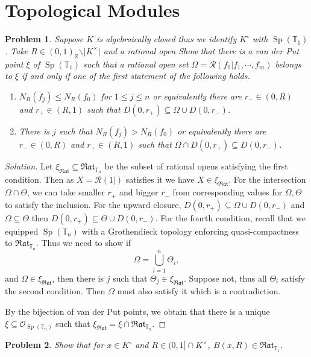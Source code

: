 \documentclass[8pt]{article}
\numberwithin{equation}{section}
\newenvironment{solution}{\begin{proof}[Solution]}{\end{proof}}
\newtheorem{problem}{Problem}[section]
\DeclareMathOperator{\Sp}{Sp}
\newcommand{\Ouv}{\mathscr{O}}
\newcommand{\R}[0]{\mathbb{R}}
\newcommand{\T}[0]{\mathbb{T}}
\newcommand{\cR}[0]{\mathcal{R}}
\newcommand{\ab}[1]{\vert #1 \vert}
\newcommand{\Rat}[0]{\mathfrak{Rat}}
\begin{document}
\section{Topological Modules}
\begin{problem}
  Suppose $K$ is algebraically closed thus we identify $K^\circ$ with $\Sp(\T_1)$. Take $R\in(0,1)_\R\backslash\ab{K^\times}$ and a rational open 
  Show that there is a van der Put point $\xi$ of $\Sp({\T_1})$ such that a rational open set $\Omega = \cR(f_0|f_1,\cdots,f_m)$ belongs to $\xi$ if and only if one of the first statement of the following holds.
  \begin{enumerate}
    \item $N_R(f_j)\leq N_R(f_0)$ for $1\leq j\leq n$ or equivalently there are $r_-\in(0,R)$ and $r_+\in (R,1)$ such that $D(0,r_+)\subseteq\Omega\cup D(0,r_-)$.
    \item There is $j$ such that $N_R(f_j)>N_R(f_0)$ or equivalently there are $r_-\in(0,R)$ and $r_+\in (R,1)$ such that $\Omega\cap D(0,r_+)\subseteq D(0,r_-)$.
  \end{enumerate}
\end{problem}
\begin{solution}
  Let $\xi_{\Rat}\subseteq\Rat_{\T_n}$ be the subset of rational opens satisfying the first condition. Then as $X=\cR(1|)$ satisfies it we have $X\in\xi_\Rat$. 
  For the intersection $\Omega\cap\Theta$, we can take smaller $r_+$ and bigger $r_-$ from corresponding values for $\Omega,\Theta$ to satisfy the inclusion.
  For the upward closure, $D(0,r_+)\subseteq\Omega\cup D(0,r_-)$ and $\Omega\subseteq\Theta$ then $D(0,r_+)\subseteq\Theta\cup D(0,r_-)$.
  For the fourth condition, recall that we equipped $\Sp(\T_n)$ with a Grothendieck topology enforcing quasi-compactness to $\Rat_{\T_n}$. Thus we need to show if 
  \begin{equation*}
    \Omega = \bigcup_{i=1}^n\Theta_i,
  \end{equation*}
  and $\Omega\in\xi_\Rat$, then there is $j$ such that $\Theta_j\in \xi_\Rat$. Suppose not, thus all $\Theta_i$ satisfy the second condition. Then $\Omega$ must also satisfy it which is a contradiction.
  \par By the bijection of van der Put points, we obtain that there is a unique $\xi\subseteq\Ouv_{\Sp(\T_n)}$ such that $\xi_\Rat = \xi\cap\Rat_{\T_n}$.
\end{solution}
\begin{problem}
  Show that for $x\in K^\circ$ and $R\in(0,1]\cap K^\times$, $B(x,R)\in\Rat_{\T_1}$.
\end{problem}
\end{document}
